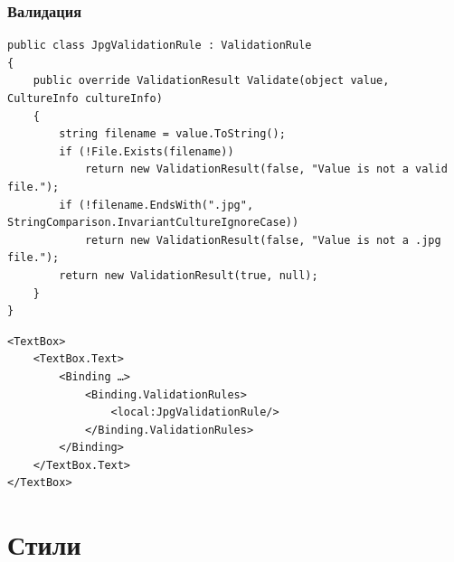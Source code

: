 \documentclass[xetex,mathserif,serif]{beamer}
\begin{document}
	\begin{frame}[fragile]
		\frametitle{Валидация}
		\begin{scriptsize}
			\begin{verbatim}
public class JpgValidationRule : ValidationRule
{
    public override ValidationResult Validate(object value, CultureInfo cultureInfo)
    {
        string filename = value.ToString();
        if (!File.Exists(filename))
            return new ValidationResult(false, "Value is not a valid file.");
        if (!filename.EndsWith(".jpg", StringComparison.InvariantCultureIgnoreCase))
            return new ValidationResult(false, "Value is not a .jpg file.");
        return new ValidationResult(true, null);
    }
}			\end{verbatim}
			\vspace{3mm}
			\begin{verbatim}
<TextBox>
    <TextBox.Text>
        <Binding …>
            <Binding.ValidationRules>
                <local:JpgValidationRule/>
            </Binding.ValidationRules>
        </Binding>
    </TextBox.Text>
</TextBox>
			\end{verbatim}
		\end{scriptsize}
	\end{frame}

	\section{Стили}
\end{document}
